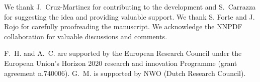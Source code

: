 We thank J.\ Cruz-Martinez for contributing to the development and S.\
Carrazza for suggesting the idea and providing valuable support. 
We thank S. Forte and J. Rojo for carefully proofreading the manuscript.
We acknowledge the NNPDF collaboration for valuable discussions
and comments.

F.~H. and A.~C. are supported by
the European Research Council under 
the European Union's Horizon 2020 research and innovation Programme
(grant agreement n.740006).
G.~M. is supported by NWO (Dutch Research Council).
